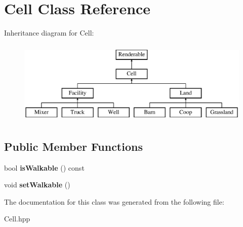 \hypertarget{class_cell}{}\section{Cell Class Reference}
\label{class_cell}
Inheritance diagram for Cell\+:\begin{figure}[H]
\begin{center}
\leavevmode
\includegraphics[height=4.000000cm]{class_cell}
\end{center}
\end{figure}
\subsection*{Public Member Functions}
\begin{DoxyCompactItemize}
\item 
\mbox{\label{class_cell_aa28cd3093696dee2dd9d3dbb345e97d4}} 
bool {\bfseries is\+Walkable} () const
\item 
\mbox{\label{class_cell_a85e3cddd7c8f38663693a4e24c0f6d77}} 
void {\bfseries set\+Walkable} ()
\end{DoxyCompactItemize}


The documentation for this class was generated from the following file\+:\begin{DoxyCompactItemize}
\item 
Cell.\+hpp\end{DoxyCompactItemize}
